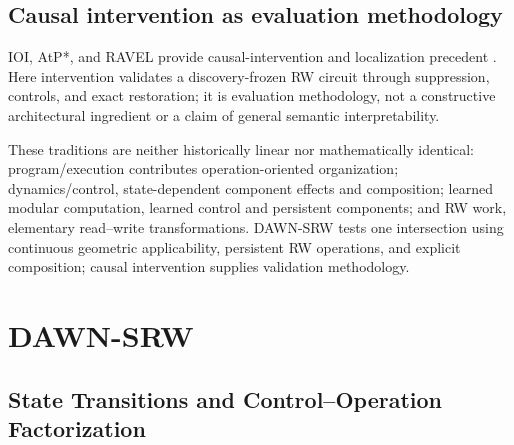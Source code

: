 \documentclass{article}
\newcommand{\DAWN}{DAWN-SRW}
\begin{document}
\subsection{Causal intervention as evaluation methodology}

IOI, AtP*, and RAVEL provide causal-intervention and localization precedent
\cite{wang2023interpretability,kramar2024atp,huang2024ravel}. Here intervention
validates a discovery-frozen RW circuit through suppression, controls, and exact
restoration; it is evaluation methodology, not a constructive architectural
ingredient or a claim of general semantic interpretability.

These traditions are neither historically linear nor mathematically identical:
program/execution contributes operation-oriented organization; dynamics/control,
state-dependent component effects and composition; learned modular computation,
learned control and persistent components; and RW work, elementary read--write
transformations. \DAWN{} tests one intersection using continuous geometric
applicability, persistent RW operations, and explicit composition; causal
intervention supplies validation methodology.

\section{DAWN-SRW}
\label{sec:method}

\subsection{State Transitions and Control--Operation Factorization}
\label{sec:state-transitions}
\label{sec:transition-hypothesis}
\end{document}
